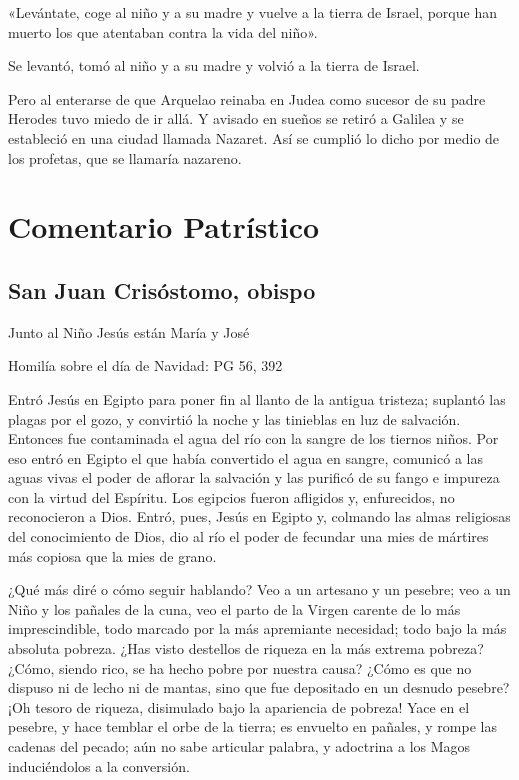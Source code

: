 \begin{body}
\begin{body}
«Levántate, coge al niño y a su madre y vuelve a la tierra de Israel,
porque han muerto los que atentaban contra la vida del niño».

Se levantó, tomó al niño y a su madre y volvió a la tierra de Israel.

Pero al enterarse de que Arquelao reinaba en Judea como sucesor de su
padre Herodes tuvo miedo de ir allá. Y avisado en sueños se retiró a
Galilea y se estableció en una ciudad llamada Nazaret. Así se cumplió lo
dicho por medio de los profetas, que se llamaría nazareno.


\section{Comentario Patrístico}

\subsection{San Juan Crisóstomo, obispo}

Junto al Niño Jesús están María y José

Homilía sobre el día de Navidad: PG 56, 392

Entró Jesús en Egipto para poner fin al llanto de la antigua tristeza; suplantó las plagas por el gozo, y convirtió la noche y las tinieblas en luz de salvación. Entonces fue contaminada el agua del río con la sangre de los tiernos niños. Por eso entró en Egipto el que había convertido el agua en sangre, comunicó a las aguas vivas el poder de aflorar la salvación y las purificó de su fango e impureza con la virtud del Espíritu. Los egipcios fueron afligidos y, enfurecidos, no reconocieron a Dios. Entró, pues, Jesús en Egipto y, colmando las almas religiosas del conocimiento de Dios, dio al río el poder de fecundar una mies de mártires más copiosa que la mies de grano.

¿Qué más diré o cómo seguir hablando? Veo a un artesano y un pesebre; veo a un Niño y los pañales de la cuna, veo el parto de la Virgen carente de lo más imprescindible, todo marcado por la más apremiante necesidad; todo bajo la más absoluta pobreza. ¿Has visto destellos de riqueza en la más extrema pobreza? ¿Cómo, siendo rico, se ha hecho pobre por nuestra causa? ¿Cómo es que no dispuso ni de lecho ni de mantas, sino que fue depositado en un desnudo pesebre? ¡Oh tesoro de riqueza, disimulado bajo la apariencia de pobreza! Yace en el pesebre, y hace temblar el orbe de la tierra; es envuelto en pañales, y rompe las cadenas del pecado; aún no sabe articular palabra, y adoctrina a los Magos induciéndolos a la conversión.


\end{body}
\end{body}
